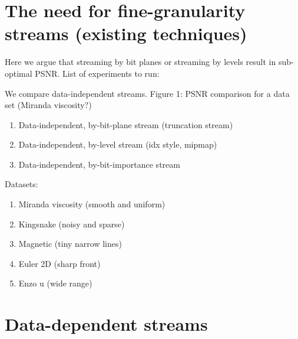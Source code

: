 \section{The need for fine-granularity streams (existing techniques)}
Here we argue that streaming by bit planes or streaming by levels result in sub-optimal PSNR.
List of experiments to run:

We compare data-independent streams. Figure 1: PSNR comparison for a data set (Miranda viscosity?)
    \begin{enumerate}
      \item Data-independent, by-bit-plane stream (truncation stream)
      \item Data-independent, by-level stream (idx style, mipmap)
      \item Data-independent, by-bit-importance stream
    \end{enumerate}


Datasets:

\begin{enumerate}
        \item Miranda viscosity (smooth and uniform)
        \item Kingsnake (noisy and sparse)
        \item Magnetic (tiny narrow lines)
        \item Euler 2D (sharp front)
        \item Enzo u (wide range)
\end{enumerate}



\section{Data-dependent streams}

